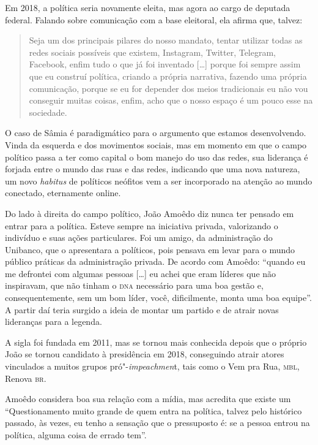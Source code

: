 Em 2018, a política seria novamente eleita, mas agora ao cargo de
deputada federal. Falando sobre comunicação com a base eleitoral, ela
afirma que, talvez:

\begin{quote}
Seja um dos principais pilares do nosso mandato, tentar utilizar todas
as redes sociais possíveis que existem, Instagram, Twitter, Telegram,
Facebook, enfim tudo o que já foi inventado {[}\ldots{}{]} porque foi sempre
assim que eu construí política, criando a própria narrativa, fazendo uma
própria comunicação, porque se eu for depender dos meios tradicionais eu
não vou conseguir muitas coisas, enfim, acho que o nosso espaço é um
pouco esse na sociedade.
\end{quote}

O caso de Sâmia é paradigmático para o argumento que estamos
desenvolvendo. Vinda da esquerda e dos movimentos sociais, mas em
momento em que o campo político passa a ter como capital o bom manejo do
uso das redes, sua liderança é forjada entre o mundo das ruas e das
redes, indicando que uma nova natureza, um novo \emph{habitus} de
políticos neófitos vem a ser incorporado na atenção ao mundo conectado,
eternamente online.

Do lado à direita do campo político, João Amoêdo diz nunca ter pensado
em entrar para a política. Esteve sempre na iniciativa privada,
valorizando o indivíduo e suas ações particulares. Foi um amigo, da
administração do Unibanco, que o apresentara a políticos, pois pensava
em levar para o mundo público práticas da administração privada. De
acordo com Amoêdo: ``quando eu me defrontei com algumas pessoas
{[}\ldots{}{]} eu achei que eram líderes que não inspiravam, que não tinham o
\textsc{dna} necessário para uma boa gestão e, consequentemente, sem um bom
líder, você, dificilmente, monta uma boa equipe''. A partir daí teria
surgido a ideia de montar um partido e de atrair novas lideranças para a
legenda.

A sigla foi fundada em 2011, mas se tornou mais conhecida depois que o
próprio João se tornou candidato à presidência em 2018, conseguindo
atrair atores vinculados a muitos grupos pró"-\emph{impeachmen}t, tais
como o Vem pra Rua, \textsc{mbl}, Renova \textsc{br}.

Amoêdo considera boa sua relação com a mídia, mas acredita que existe um
``Questionamento muito grande de quem entra na política, talvez pelo
histórico passado, às vezes, eu tenho a sensação que o pressuposto é: se
a pessoa entrou na política, alguma coisa de errado tem''.

